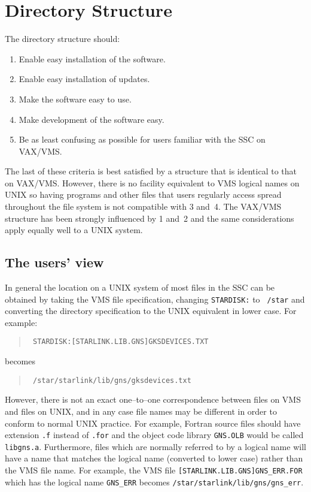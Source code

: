 \section{Directory Structure}
The directory structure should:
\begin{enumerate}
\item Enable easy installation of the software.
\item Enable easy installation of updates.
\item Make the software easy to use.
\item Make development of the software easy.
\item Be as least confusing as possible for users familiar with the SSC on
VAX/VMS.
\end{enumerate}

The last of these criteria is best satisfied by a structure that is identical
to that on VAX/VMS. However, there is no facility equivalent to VMS logical
names on UNIX so having programs and other files that users regularly access
spread throughout the file system is not compatible with 3 and~4. The VAX/VMS
structure has been strongly influenced by 1 and~2 and the same considerations
apply equally well to a UNIX system.

\subsection{The users' view}
In general the location on a UNIX system of most files in the SSC can be
obtained by taking the VMS file specification, changing {\tt STARDISK:} to {\tt
/star} and converting the directory specification to the UNIX equivalent in
lower case. For example:
\begin{quote}\tt
STARDISK:[STARLINK.LIB.GNS]GKSDEVICES.TXT
\end{quote}
becomes
\begin{quote}\tt
/star/starlink/lib/gns/gksdevices.txt
\end{quote}

However, there is not an exact one--to--one correspondence between files on VMS
and files on UNIX, and in any case file names may be different in
order to conform to normal UNIX practice. For example, Fortran source files
should have extension {\tt .f} instead of {\tt .for} and the object code 
library {\tt GNS.OLB} would be
called {\tt libgns.a}. Furthermore, files which are normally referred to by a
logical name will have a name that matches the logical name (converted to lower
case) rather than the VMS file name. For example, the VMS file
{\tt [STARLINK.LIB.GNS]GNS\_ERR.FOR} which has the logical name {\tt GNS\_ERR}
becomes {\tt /star/starlink/lib/gns/gns\_err}. 

